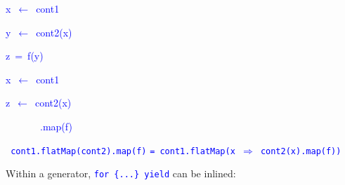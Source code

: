 \texttt{\textcolor{blue}{\footnotesize{}}}%
\begin{minipage}[c][1\totalheight][t]{0.49\columnwidth}%
\begin{lyxcode}
\textcolor{blue}{\footnotesize{}x~$\leftarrow$~cont1}{\footnotesize\par}

\textcolor{blue}{\footnotesize{}y~$\leftarrow$~cont2(x)}{\footnotesize\par}

\textcolor{blue}{\footnotesize{}z~=~f(y)}{\footnotesize\par}
\end{lyxcode}
%
\end{minipage}\texttt{\textcolor{blue}{\footnotesize{}\hfill{}}}%
\begin{minipage}[c][1\totalheight][t]{0.49\columnwidth}%
\begin{lyxcode}
\textcolor{blue}{\footnotesize{}x~$\leftarrow$~cont1}{\footnotesize\par}

\textcolor{blue}{\footnotesize{}z~$\leftarrow$~cont2(x)}{\footnotesize\par}

\textcolor{blue}{\footnotesize{}~~~~~~~.map(f)}{\footnotesize\par}
\end{lyxcode}
%
\end{minipage}\texttt{\textcolor{blue}{\footnotesize{}\hfill{}\medskip{}
cont1.flatMap(cont2).map(f)}} \texttt{\textcolor{blue}{\footnotesize{}=
cont1.flatMap(x $\Rightarrow$ cont2(x).map(f))}} 

Within a generator, \texttt{\textcolor{blue}{\footnotesize{}for \{...\}
yield}} can be inlined:

